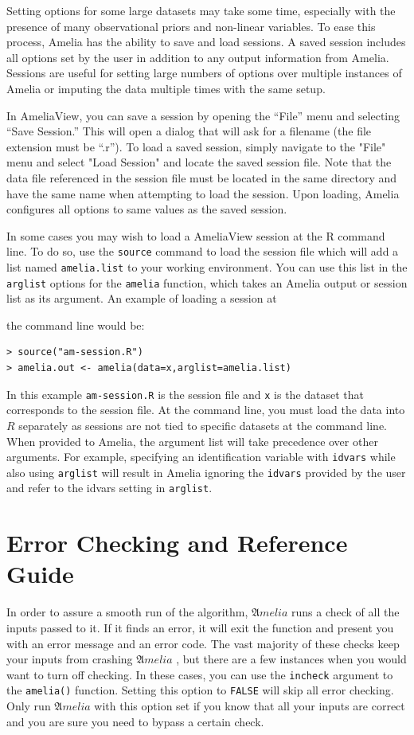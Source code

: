 \documentclass[12pt,titlepage]{article}
\newcommand{\Amelia}{\ensuremath{\mathfrak Amelia} }
\begin{document}
Setting options for some large datasets may take some time, especially
with the presence of many observational priors and non-linear
variables.  To ease this process, Amelia has the ability to save and
load sessions.  A saved session includes all options set by the user
in addition to any output information from Amelia.  Sessions are
useful for setting large numbers of options over multiple instances of
Amelia or imputing the data multiple times with the same setup.

In AmeliaView, you can save a session by opening the ``File'' menu and
selecting ``Save Session.''  This will open a dialog that will ask for
a filename (the file extension must be ``.r'').  To load a saved
session, simply navigate to the "File" menu and select "Load Session"
and locate the saved session file.  Note that the data file referenced
in the session file must be located in the same directory and have the
same name when attempting to load the session.  Upon loading, Amelia
configures all options to same values as the saved session.

In some cases you may wish to load a AmeliaView session at the R
command line.  To do so, use the \texttt{source} command to load the
session file which will add a list named \texttt{amelia.list} to your
working environment.  You can use this list in the \texttt{arglist}
options for the \texttt{amelia} function, which takes an Amelia output
or session list as its argument.  An example of loading a session at

the command line would be:

\begin{verbatim}
> source("am-session.R") 
> amelia.out <- amelia(data=x,arglist=amelia.list)
\end{verbatim}

In this example \texttt{am-session.R} is the session file and
\texttt{x} is the dataset that corresponds to the session file.  At
the command line, you must load the data into $R$ separately as sessions
are not tied to specific datasets at the command line.  When provided
to Amelia, the argument list will take precedence over other
arguments.  For example, specifying an identification variable with
\texttt{idvars} while also using \texttt{arglist} will result in
Amelia ignoring the \texttt{idvars} provided by the user and refer to
the idvars setting in \texttt{arglist}.

\section{Error Checking and Reference Guide}
\label{sec:errors}
In order to assure a smooth run of the algorithm, \Amelia runs a check
of all the inputs passed to it.  If it finds an error, it will exit
the function and present you with an error message and an error code.
The vast majority of these checks keep your inputs from crashing
\Amelia, but there are a few instances when you would want to turn off
checking.  In these cases, you can use the \texttt{incheck} argument
to the \texttt{amelia()} function.  Setting this option to
\texttt{FALSE} will skip all error checking.  Only run \Amelia with
this option set if you know that all your inputs are correct and you
are sure you need to bypass a certain check.
\end{document}
